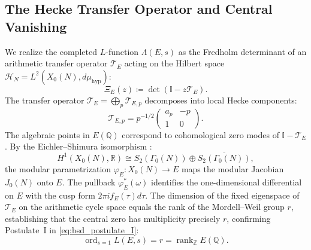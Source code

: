 \documentclass[11pt,reqno]{article}
\theoremstyle{plain}
\theoremstyle{definition}
\DeclareMathOperator{\rank}{rank}
\DeclareMathOperator{\ord}{ord}
\begin{document}
\subsection{The Hecke Transfer Operator and Central Vanishing}

We realize the completed $L$-function $\Lambda(E, s)$ as the Fredholm determinant of an arithmetic transfer operator $\mathcal{T}_E$ acting on the Hilbert space $\mathcal{H}_N = L^2(X_0(N), d\mu_{\mathrm{hyp}})$:
\begin{equation}
    \Xi_E(z) \coloneqq \det\left( \mathbb{I} - z \mathcal{T}_E \right).
\end{equation}
The transfer operator $\mathcal{T}_E = \bigoplus_{p} \mathcal{T}_{E, p}$ decomposes into local Hecke components:
\begin{equation}
    \mathcal{T}_{E, p} = p^{-1/2} \begin{pmatrix} a_p & -p \\ 1 & 0 \end{pmatrix}.
\end{equation}
The algebraic points in $E(\mathbb{Q})$ correspond to cohomological zero modes of $\mathbb{I} - \mathcal{T}_E$. By the Eichler--Shimura isomorphism \cite{eichler_1954, shimura_1958}:
\begin{equation}
    H^1(X_0(N), \mathbb{R}) \cong S_2(\Gamma_0(N)) \oplus \overline{S_2(\Gamma_0(N))},
\end{equation}
the modular parametrization $\varphi_E: X_0(N) \to E$ maps the modular Jacobian $J_0(N)$ onto $E$. The pullback $\varphi_E^*(\omega)$ identifies the one-dimensional differential on $E$ with the cusp form $2\pi i f_E(\tau) d\tau$. The dimension of the fixed eigenspace of $\mathcal{T}_E$ on the arithmetic cycle space equals the rank of the Mordell--Weil group $r$, establishing that the central zero has multiplicity precisely $r$, confirming Postulate~I in \eqref{eq:bsd_postulate_I}:
\begin{equation}
    \ord_{s=1} L(E, s) = r = \rank_{\mathbb{Z}} E(\mathbb{Q}).
\end{equation}
\end{document}
